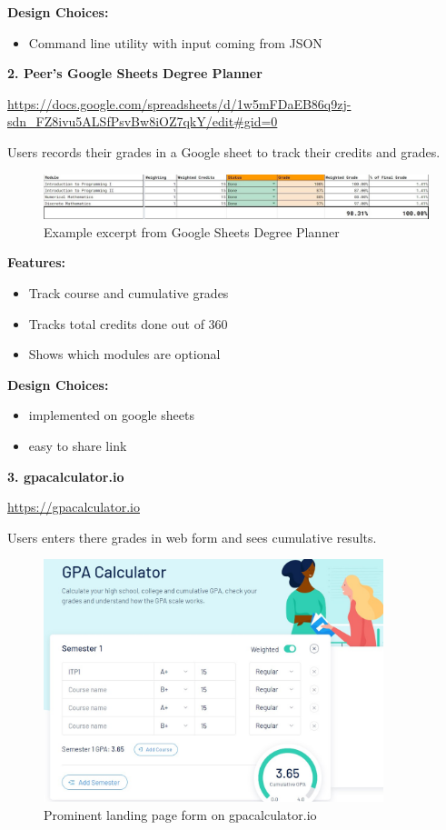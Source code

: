 \documentclass{article}
\begin{document}
\noindent \textbf{Design Choices:}
\begin{itemize}
\item Command line utility with input coming from JSON
\end{itemize}
\medskip

\noindent \textbf{2. Peer's Google Sheets Degree Planner}

\noindent \sloppy \url{https://docs.google.com/spreadsheets/d/1w5mFDaEB86q9zj-sdn_FZ8ivu5ALSfPsvBw8iOZ7qkY/edit#gid=0}
\bigskip

\noindent Users records their grades in a Google sheet to track their credits and grades.
\bigskip

\begin{figure}[h]
\noindent \includegraphics[width=\textwidth]{degree-planner-partial}
\centering
\caption{Example excerpt from Google Sheets Degree Planner}
\label{fig: deg-planner}
\end{figure}

\noindent \textbf{Features:}
\begin{itemize}
\item Track course and cumulative grades
\item Tracks total credits done out of 360
\item Shows which modules are optional
\end{itemize}
\medskip

\noindent \textbf{Design Choices:}
\begin{itemize}
\item implemented on google sheets
\item easy to share link
\end{itemize}
\medskip

\noindent \textbf{3. gpacalculator.io}

\noindent \url{https://gpacalculator.io}
\bigskip

\noindent Users enters there grades in web form and sees cumulative results.
\bigskip

\begin{figure}[h]
\noindent \includegraphics[height=200pt]{gpa-calculator-io}
\centering
\caption{Prominent landing page form on gpacalculator.io}
\label{fig: gpa-calc}
\end{figure}
\medskip
\end{document}
